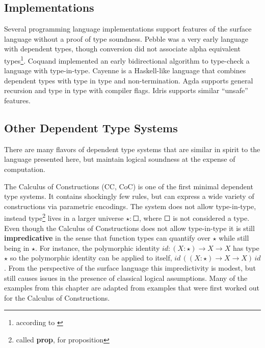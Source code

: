 
\subsection{Implementations}

Several programming language implementations support features of the surface language without a proof of type soundness.
Pebble\cite{10.1007/3-540-13346-1_1} was a very early language with dependent types, though conversion did not associate alpha equivalent types\footnote{according to \cite{Reinhold89typecheckingis}}.
Coquand implemented an early bidirectional algorithm to type-check a language with type-in-type\cite{COQUAND1996167}.
Cayenne\cite{10.1145/289423.289451} is a Haskell-like language that combines dependent types with type in type and non-termination.
Agda supports general recursion and type in type with compiler flags.
Idris supports similar ``unsafe'' features.


\subsection{Other Dependent Type Systems}

There are many flavors of dependent type systems that are similar in spirit to the language presented here, but maintain logical soundness at the expense of computation.

The Calculus of Constructions (\ac{CC}, CoC)\cite{10.1016/0890-5401(88)90005-3} is one of the first minimal dependent type systems.
It contains shockingly few rules, but can express a wide variety of constructions via parametric encodings.
The system does not allow type-in-type, instead type\footnote{called \textbf{prop}, for proposition} lives in a larger universe $\star:\Square$, where $\Square$ is not considered a type.
Even though the Calculus of Constructions does not allow type-in-type it is still \textbf{impredicative} in the sense that function types can quantify over $\star$ while still being in $\star$.
For instance, the polymorphic identity $id:(X:\star)\rightarrow X\rightarrow X$ has type $\star$ so the polymorphic identity can be applied to itself, $id\,\left((X:\star)\rightarrow X\rightarrow X\right)\,id$.
From the perspective of the surface language this impredictivity is modest, but still causes issues in the presence of classical logical assumptions. 
Many of the examples from this chapter are adapted from examples that were first worked out for the Calculus of Constructions.

